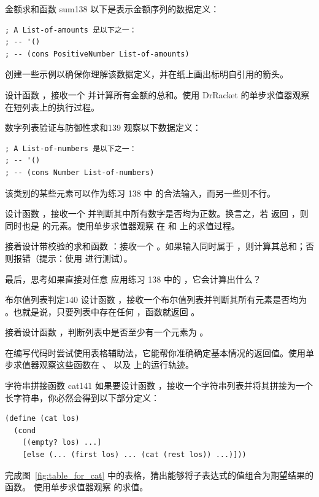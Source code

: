 \begin{exercise}{金额求和函数 sum}{138}
以下是表示金额序列的数据定义：
\begin{lstlisting}[language=BSL]
; A List-of-amounts 是以下之一：
; -- '()
; -- (cons PositiveNumber List-of-amounts)
\end{lstlisting}
创建一些示例以确保你理解该数据定义，并在纸上画出标明自引用的箭头。

设计函数 ，接收一个  并计算所有金额的总和。使用 DrRacket 的单步求值器观察  在短列表上的执行过程。
\end{exercise}

\begin{exercise}{数字列表验证与防御性求和}{139}
观察以下数据定义：
\begin{lstlisting}[language=BSL]
; A List-of-numbers 是以下之一：
; -- '()
; -- (cons Number List-of-numbers)
\end{lstlisting}
该类别的某些元素可以作为练习 138 中  的合法输入，而另一些则不行。

设计函数 ，接收一个  并判断其中所有数字是否均为正数。换言之，若  返回 ，则  同时也是  的元素。使用单步求值器观察  在  和  上的求值过程。

接着设计带校验的求和函数 ：接收一个 。如果输入同时属于 ，则计算其总和；否则报错（提示：使用  进行测试）。

最后，思考如果直接对任意  应用练习 138 中的 ，它会计算出什么？
\end{exercise}

\begin{exercise}{布尔值列表判定}{140}
设计函数 ，接收一个布尔值列表并判断其所有元素是否均为 。也就是说，只要列表中存在任何 ，函数就返回 。

接着设计函数 ，判断列表中是否至少有一个元素为 。

在编写代码时尝试使用表格辅助法，它能帮你准确确定基本情况的返回值。使用单步求值器观察这些函数在 、 以及  上的运行轨迹。
\end{exercise}

\begin{exercise}{字符串拼接函数 cat}{141}
如果要设计函数 ，接收一个字符串列表并将其拼接为一个长字符串，你必然会得到以下部分定义：
\begin{lstlisting}[language=BSL]
(define (cat los)
  (cond
    [(empty? los) ...]
    [else (... (first los) ... (cat (rest los)) ...)]))
\end{lstlisting}
完成图~\ref{fig:table_for_cat} 中的表格，猜出能够将子表达式的值组合为期望结果的函数。
使用单步求值器观察  的求值。
\end{exercise}

